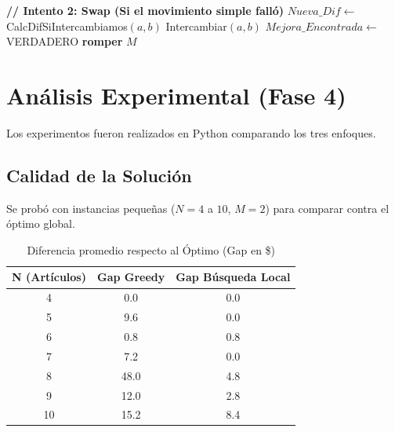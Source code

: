 \documentclass[12pt, a4paper]{article}
\begin{document}
\begin{algorithm}[H]
\begin{algorithmic}[1]
                        \EndIf
                    \EndIf
                \EndFor
                \State
                \State \textbf{// Intento 2: Swap (Si el movimiento simple falló)}
                            \State $Nueva\_Dif \gets$ CalcDifSiIntercambiamos$(a, b)$
                                \State Intercambiar$(a, b)$
                                \State $Mejora\_Encontrada \gets$ VERDADERO
                                \State \textbf{romper}
                            \EndIf
                        \EndIf
                    \EndFor
                \EndIf
            \EndWhile
            \State
            \State \Return $M$
        \end{algorithmic}
    \end{algorithm}

    \section{Análisis Experimental (Fase 4)}
    Los experimentos fueron realizados en Python comparando los tres enfoques.

    \subsection{Calidad de la Solución}
    Se probó con instancias pequeñas ($N=4$ a $10$, $M=2$) para comparar contra el óptimo global.

    \begin{table}[H]
        \centering
        \caption{Diferencia promedio respecto al Óptimo (Gap en \$)}
        \label{tab:resultados}
        \begin{tabular}{@{}ccc@{}}
            \toprule
            \textbf{N (Artículos)} & \textbf{Gap Greedy} & \textbf{Gap Búsqueda Local} \\ \midrule
            4  & 0.0  & 0.0 \\
            5  & 9.6  & 0.0 \\
            6  & 0.8  & 0.8 \\
            7  & 7.2  & 0.0 \\
            8  & 48.0 & 4.8 \\
            9  & 12.0 & 2.8 \\
            10 & 15.2 & 8.4 \\ \bottomrule
        \end{tabular}
    \end{table}
\end{document}
